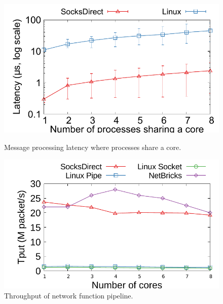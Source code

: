 \begin{figure}[t!]
	\centering

	\hspace{0.01\textwidth}
	\begin{minipage}{.31\textwidth}
		
		\centering \includegraphics[width=\textwidth]{eval/microbenchmark/sharecore-lat.pdf}
		\vspace{-15pt}
		\caption{Message processing latency where processes share a core.}
		\label{fig:eval-context-switch}
	\end{minipage}
	\hspace{0.01\textwidth}
	\begin{minipage}{.31\textwidth}
		\centering
		\includegraphics[width=\textwidth]{eval/microbenchmark/nfv-tun-tput.pdf}
		\vspace{-15pt}
		\caption{Throughput of network function pipeline.}
		\label{fig:eval-tun-tput}
		

\end{minipage}
\end{figure}
